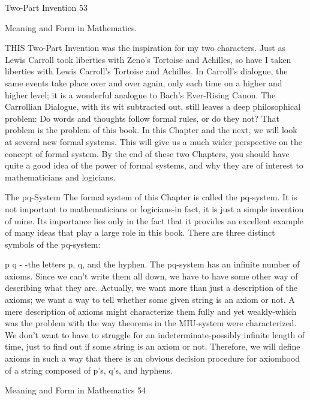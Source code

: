 Two-Part Invention                                                                       53



                            Meaning and Form
                             in Mathematics.

THIS Two-Part Invention was the inspiration for my two characters. Just as Lewis
Carroll took liberties with Zeno's Tortoise and Achilles, so have I taken liberties with
Lewis Carroll's Tortoise and Achilles. In Carroll's dialogue, the same events take place
over and over again, only each time on a higher and higher level; it is a wonderful
analogue to Bach's Ever-Rising Canon. The Carrollian Dialogue, with its wit subtracted
out, still leaves a deep philosophical problem: Do words and thoughts follow formal
rules, or do they not? That problem is the problem of this book.
In this Chapter and the next, we will look at several new formal systems. This will give
us a much wider perspective on the concept of formal system. By the end of these two
Chapters, you should have quite a good idea of the power of formal systems, and why
they are of interest to mathematicians and logicians.

                                    The pq-System
The formal system of this Chapter is called the pq-system. It is not important to
mathematicians or logicians-in fact, it is just a simple invention of mine. Its importance
lies only in the fact that it provides an excellent example of many ideas that play a large
role in this book. There are three distinct symbols of the pq-system:

                                       p       q    -
-the letters p, q, and the hyphen.
The pq-system has an infinite number of axioms. Since we can't write them all down, we
have to have some other way of describing what they are. Actually, we want more than
just a description of the axioms; we want a way to tell whether some given string is an
axiom or not. A mere description of axioms might characterize them fully and yet
weakly-which was the problem with the way theorems in the MIU-system were
characterized. We don't want to have to struggle for an indeterminate-possibly infinite
length of time, just to find out if some string is an axiom or not. Therefore, we will define
axioms in such a way that there is an obvious decision procedure for axiomhood of a
string composed of p's, q's, and hyphens.




Meaning and Form in Mathematics                                                           54

